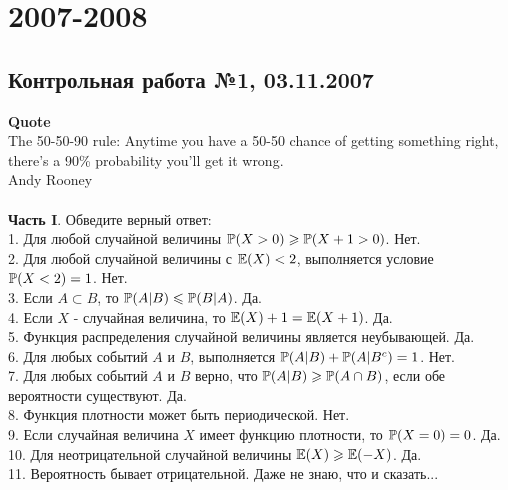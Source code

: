 \documentclass[12pt, a4paper]{article}\usepackage[]{graphicx}\usepackage[]{color}
\begin{document}
	\section{2007-2008}



	\subsection{Контрольная работа №1, 03.11.2007}

	\textbf{Quote}\\
	The 50-50-90 rule: Anytime you have a 50-50 chance of getting something right, there's a 90\% probability you'll get it wrong. \\
	Andy Rooney\\ \\

	\textbf{Часть I}. Обведите верный ответ: \\

	1. Для любой случайной величины $\P(X>0)\ge \P(X+1>0)$. Нет. \\

	2. Для любой случайной величины с $\E(X)<2$, выполняется условие $\P(X<2)=1$. Нет. \\

	3. Если $A\subset B$, то $\P(A|B)\le \P(B|A)$. Да. \\

	4. Если  $X$  - случайная величина, то $\E(X)+1=\E(X+1)$. Да. \\

	5. Функция распределения случайной величины является неубывающей. Да. \\

	6. Для любых событий $A$ и $B$, выполняется $\P(A|B)+\P(A|B^{c})=1$. Нет. \\

	7. Для любых событий  $A$  и  $B$  верно, что $\P(A|B)\ge \P(A\cap
	B)$, если обе вероятности существуют. Да.  \\

	8. Функция плотности может быть периодической. Нет. \\

	9. Если случайная величина $X$ имеет функцию плотности, то $\P(X=0)=0$. Да.  \\

	10. Для неотрицательной случайной величины $\E(X)\ge \E(-X)$. Да. \\

	11. Вероятность бывает отрицательной. Даже не знаю, что и сказать... \\
\end{document}
